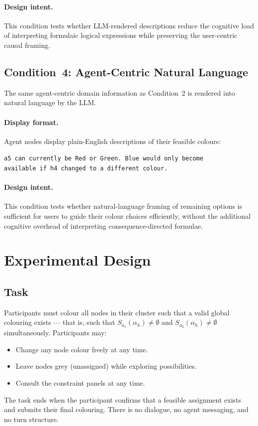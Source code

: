 \documentclass[10pt]{article}
\theoremstyle{definition}
\begin{document}
\paragraph{Design intent.}
This condition tests whether LLM-rendered descriptions reduce the cognitive load of interpreting
formulaic logical expressions while preserving the user-centric causal framing.

\subsection{Condition~4: Agent-Centric Natural Language}
\label{sec:c4}

The same agent-centric domain information as Condition~2 is rendered into natural language by
the LLM.

\paragraph{Display format.}
Agent nodes display plain-English descriptions of their feasible colours:
\begin{center}
\small
\texttt{a5 can currently be Red or Green. Blue would only become}\\
\texttt{available if h4 changed to a different colour.}
\end{center}

\paragraph{Design intent.}
This condition tests whether natural-language framing of remaining options is sufficient for users
to guide their colour choices efficiently, without the additional cognitive overhead of interpreting
consequence-directed formulae.

\section{Experimental Design}
\label{sec:experiment}

\subsection{Task}

Participants must colour all nodes in their cluster such that a valid global colouring exists ---
that is, such that $S_{a_1}(\alpha_h) \neq \emptyset$ and $S_{a_2}(\alpha_h) \neq \emptyset$
simultaneously.  Participants may:
\begin{itemize}
  \item Change any node colour freely at any time.
  \item Leave nodes grey (unassigned) while exploring possibilities.
  \item Consult the constraint panels at any time.
\end{itemize}
The task ends when the participant confirms that a feasible assignment exists and submits their
final colouring.  There is no dialogue, no agent messaging, and no turn structure.
\end{document}
